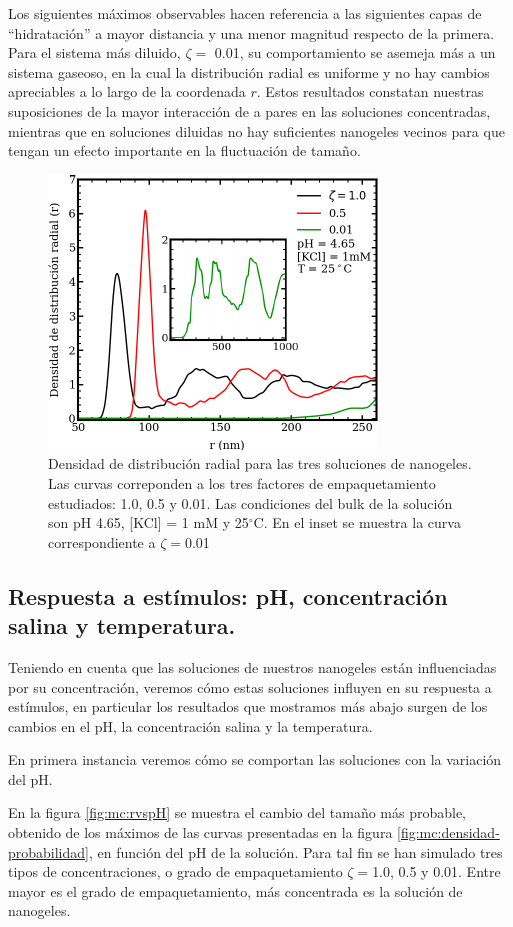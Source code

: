	Los siguientes m\'aximos observables hacen referencia a las siguientes capas de ``hidrataci\'on'' a mayor distancia y una menor magnitud respecto de la primera.
	Para el sistema m\'as diluido, $\zeta =$ 0.01, su comportamiento se asemeja m\'as a un sistema gaseoso, en la cual la distribuci\'on radial es uniforme y no hay cambios apreciables a lo largo de la coordenada $r$.
	Estos resultados constatan nuestras suposiciones de la mayor interacci\'on de a pares en las soluciones concentradas, mientras que en soluciones diluidas no hay suficientes nanogeles vecinos para que tengan un efecto importante en la fluctuaci\'on de tama\~no.
	
	
	\begin{figure}
		\centering
		\includegraphics[width=0.45\linewidth]{Figures/graph-mc/rdf-normal.pdf}
		\caption{Densidad de distribuci\'on radial para las tres soluciones de nanogeles. Las curvas correponden a los tres factores de empaquetamiento estudiados: 1.0, 0.5 y 0.01. Las condiciones del bulk de la soluci\'on son pH 4.65, [KCl] = 1 mM y 25$^\circ$C. En el inset se muestra la curva correspondiente a $\zeta = $0.01}
		\label{fig:mc:rdf}
	\end{figure}
	
	
	\subsection{Respuesta a est\'imulos: pH, concentraci\'on salina y temperatura.}
	
	Teniendo en cuenta que las soluciones de nuestros nanogeles est\'an influenciadas por su concentraci\'on, veremos c\'omo estas soluciones influyen en su respuesta a est\'imulos, en particular los resultados que mostramos m\'as abajo surgen de los cambios en el pH, la concentraci\'on salina y la temperatura.
	
	En primera instancia veremos c\'omo se comportan las soluciones con la variaci\'on del pH.
	
	En la figura \ref{fig:mc:rvspH} se muestra el cambio del tama\~no m\'as probable, obtenido de los m\'aximos de las curvas presentadas en la figura \ref{fig:mc:densidad-probabilidad}, en funci\'on del pH de la soluci\'on. Para tal fin se han simulado tres tipos de concentraciones, o grado de empaquetamiento $\zeta = $1.0, 0.5 y 0.01. Entre mayor es el grado de empaquetamiento, m\'as concentrada es la soluci\'on de nanogeles.
	
